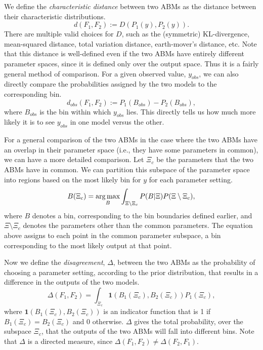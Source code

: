 We define the \emph{characteristic distance} between two ABMs as the distance between their characteristic distributions.
\begin{equation}
d(F_1, F_2) := D(P_1(y), P_2(y)). \label{eq:charDist}
\end{equation}
There are multiple valid choices for $D$, such as the (symmetric) KL-divergence, mean-squared distance, total variation distance, earth-mover's distance, etc. Note that this distance is well-defined even if the two ABMs have entirely different parameter spaces, since it is defined only over the output space. Thus it is a fairly general method of comparison. 
For a given observed value, $y_{obs}$, we can also directly compare the 
probabilities assigned by the two models to the corresponding bin.
\begin{equation}
    d_{obs}(F_1, F_2) := P_1(B_{obs}) - P_2(B_{obs}),
\end{equation}
where $B_{obs}$ is the bin within which $y_{obs}$ lies. This directly tells us how much more likely it is to see $y_{obs}$ in one model versus the other.

For a general comparison of the two ABMs in the case where the two ABMs have an overlap in their parameter space (i.e., they have some parameters in common), we can have a more detailed comparison. Let $\Xi_{c}$ be the parameters that the two ABMs have in common. We can partition this subspace of the parameter space into regions based on the most likely bin for $y$ for each parameter setting.
\begin{equation}
    B(\Xi_{c}) = \operatorname*{arg\,max}_B \int_{\Xi \setminus \Xi_{c}} P(B|\Xi)P(\Xi \setminus \Xi_{c}),
\label{eqn:B}
\end{equation}
where $B$ denotes a bin, corresponding to the bin boundaries defined earlier, and $\Xi \setminus \Xi_{c}$ denotes the parameters other than the common parameters. The equation above assigns to each point in the common parameter subspace, a bin corresponding to the most likely output at that point.

Now we define the \emph{disagreement}, $\Delta$, between the two ABMs as the probability of choosing a parameter setting, according to the prior distribution, that results in a difference in the outputs of the two models.
\begin{equation}
    \Delta(F_1, F_2) = \int_{\Xi_{c}} \mathbf{1}(B_1(\Xi_{c}), B_2(\Xi_{c}))P_1(\Xi_{c}),  \label{eq:disagreement}
\end{equation}
where $\mathbf{1}(B_1(\Xi_{c}), B_2(\Xi_{c}))$ is an indicator function that is 1 if $B_1(\Xi_{c}) = B_2(\Xi_{c})$ and 0 otherwise. $\Delta$ gives the total probability, over the subspace $\Xi_c$, that the outputs of the two ABMs will fall into different bins. Note that $\Delta$ is a directed measure, since $\Delta(F_1, F_2) \ne \Delta(F_2, F_1)$.

